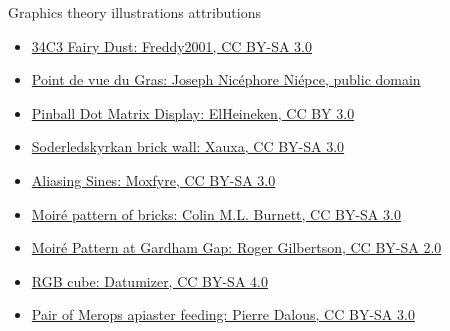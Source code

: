 \begin{frame}{Graphics theory illustrations attributions}
  \small
  \begin{itemize}
  \item \href{https://commons.wikimedia.org/wiki/File:2017-12-28_Leipzig,_34c3,_Fairy_Dust_(freddy2001).jpg}{34C3 Fairy Dust: Freddy2001, CC BY-SA 3.0}
  \item \href{https://commons.wikimedia.org/wiki/File:View_from_the_Window_at_Le_Gras,_Joseph_Nic\%C3\%A9phore_Ni\%C3\%A9pce.jpg}{Point de vue du Gras: Joseph Nicéphore Niépce, public domain}
  \item \href{https://commons.wikimedia.org/wiki/File:Pinball_Dot_Matrix_Display_-_Demolition_Man.JPG}{Pinball Dot Matrix Display: ElHeineken, CC BY 3.0}
  \item \href{https://commons.wikimedia.org/wiki/File:Soderledskyrkan_brick_wall.jpg}{Soderledskyrkan brick wall: Xauxa, CC BY-SA 3.0}
  \item \href{https://commons.wikimedia.org/wiki/File:AliasingSines.svg}{Aliasing Sines: Moxfyre, CC BY-SA 3.0}
  \item \href{https://commons.wikimedia.org/wiki/File:Moire_pattern_of_bricks.jpg}{Moiré pattern of bricks: Colin M.L. Burnett, CC BY-SA 3.0}
  \item \href{https://commons.wikimedia.org/wiki/File:Moire_pattern_of_bricks_small.jpg}{Moiré Pattern at Gardham Gap: Roger Gilbertson, CC BY-SA 2.0}
  \item \href{https://commons.wikimedia.org/wiki/File:RGBCube_a.svg}{RGB cube: Datumizer, CC BY-SA 4.0}
  \item \href{https://commons.wikimedia.org/wiki/File:Pair_of_Merops_apiaster_feeding.jpg}{Pair of Merops apiaster feeding: Pierre Dalous, CC BY-SA 3.0}
  \end{itemize}
\end{frame}

